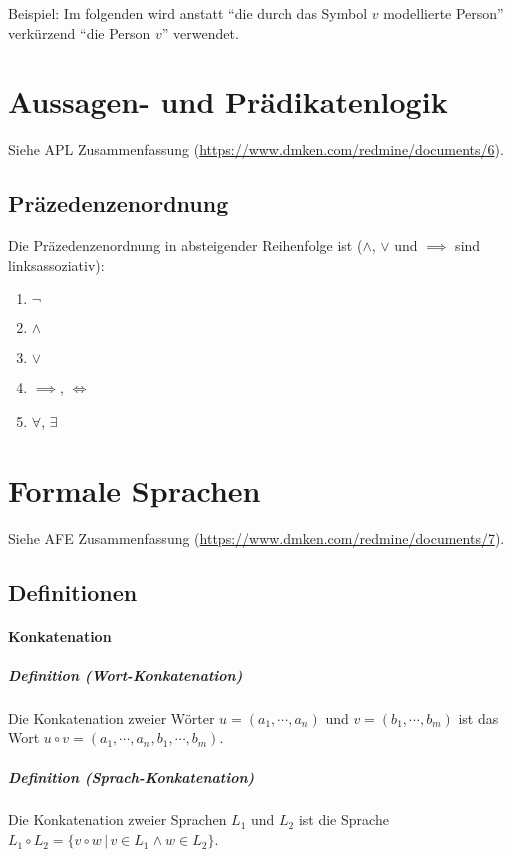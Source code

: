 \documentclass[a4paper, 11pt, accentcolor = tud3b]{tudreport}
\newcommand{\forwhich}{\ensuremath{{\,\vert\,}}}
\newcommand{\definition}[2]{\subparagraph{Definition (#1)} #2}
\begin{document}
			    Beispiel: Im folgenden wird anstatt \enquote{die durch das Symbol $ v $ modellierte Person} verkürzend \enquote{die Person $ v $} verwendet.
	    
	    \section{Aussagen- und Prädikatenlogik}
		    Siehe APL Zusammenfassung (\url{https://www.dmken.com/redmine/documents/6}).
		    
		    \subsection{Präzedenzenordnung}
				Die Präzedenzenordnung in absteigender Reihenfolge ist ($ \land $, $ \lor $ und $ \implies $ sind linksassoziativ):
				\begin{enumerate}
					\item $ \lnot $
					\item $ \land $
					\item $ \lor $
					\item $ \implies $, $ \iff $
					\item $ \forall $, $ \exists $
				\end{enumerate}
	    
	    \section{Formale Sprachen}
		    Siehe AFE Zusammenfassung (\url{https://www.dmken.com/redmine/documents/7}).
		    
		    \subsection{Definitionen}
			    \paragraph{Konkatenation}
				    \definition{Wort-Konkatenation}{Die Konkatenation zweier Wörter $ u = (a _ 1, \cdots, a _ n) $ und $ v = (b _ 1, \cdots, b _ m) $ ist das Wort $ u \circ v = (a _ 1, \cdots, a _ n, b _ 1, \cdots, b _ m) $.}
				    
					\definition{Sprach-Konkatenation}{Die Konkatenation zweier Sprachen $ L _ 1 $ und $ L _ 2 $ ist die Sprache $ L _ 1 \circ L _ 2 = \{ v \circ w \forwhich v \in L _ 1 \land w \in L _ 2 \} $.}
				    
\end{document}

